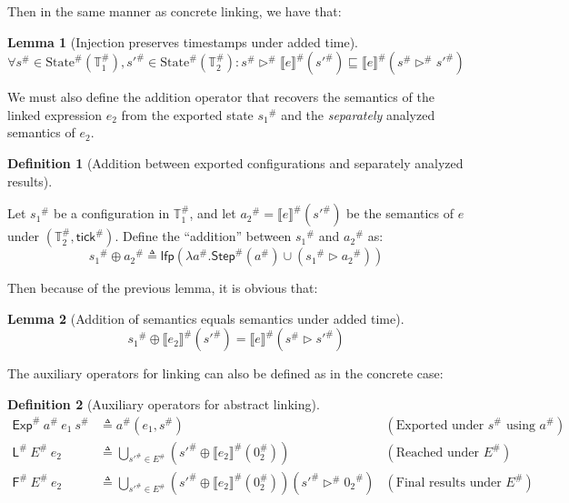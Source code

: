 \documentclass[acmsmall,review]{acmart}\settopmatter{printfolios=true,printccs=false,printacmref=false}
\theoremstyle{definition}
\newtheorem{definition}{Definition}[section]
\newtheorem{lem}{Lemma}[section]
\newcommand*{\A}[1]{{#1}^{\#}}
\newcommand*{\Time}{\mathbb{T}}
\newcommand*{\ATime}{\A{\Time}}
\newcommand*{\AState}[1]{\A{\text{State}}({#1})}
\newcommand*{\EE}{\mathsf{Exp}}
\newcommand*{\LL}{\mathsf{L}}
\newcommand*{\sembracket}[1]{\lBrack{#1}\rBrack}
\newcommand*{\tick}{\mathsf{tick}}
\begin{document}
Then in the same manner as concrete linking, we have that:

\begin{lem}[Injection preserves timestamps under added time]
  \[
    \forall \A{s}\in\AState{\ATime_1},\A{s'}\in\AState{\ATime_2}:\A{s}\A\rhd{\A{\sembracket{e}}}(\A{s'})\sqsubseteq\A{\sembracket{e}}(\A{s}\A\rhd\A{s'})
  \]
\end{lem}

We must also define the addition operator that recovers the semantics of the linked expression $e_2$ from the exported state $\A{s_1}$ and the \emph{separately} analyzed semantics of $e_2$.

\begin{definition}[Addition between exported configurations and separately analyzed results]
  $\:$

  Let $\A{s_1}$ be a configuration in $\ATime_1$, and let $\A{a_2}=\A{\sembracket{e}}(\A{s'})$ be the semantics of $e$ under $(\ATime_2,\A\tick)$.
  Define the ``addition'' between $\A{s_1}$ and $\A{a_2}$ as:
  \[
    \A{s_1}\oplus\A{a_2}\triangleq\mathsf{lfp}(\lambda\A{a}.\A{\mathsf{Step}}(\A{a})\cup(\A{s_1}\rhd\A{a_2}))
  \]
\end{definition}

Then because of the previous lemma, it is obvious that:
\begin{lem}[Addition of semantics equals semantics under added time]
  \[
    \A{s_1}\oplus\A{\sembracket{e_2}}(\A{s'}) = \A{\sembracket{e}}(\A{s}\rhd\A{s'})
  \]
\end{lem}

The auxiliary operators for linking can also be defined as in the concrete case:
\begin{definition}[Auxiliary operators for abstract linking]
  \begin{align*}
    \A\EE\:\A{a}\:e_1\:\A{s}   & \triangleq\A{a}(e_1,\A{s})                                                                          & (\text{Exported under }\A{s}\text{ using }\A{a}) \\
    \A\LL\:\A{E}\:e_2          & \triangleq\bigcup_{\A{s'}\in \A{E}}(\A{s'}\oplus\A{\sembracket{e_2}}(\A{0}_2))                      & (\text{Reached under }\A{E})                     \\
    \A{\mathsf{F}}\:\A{E}\:e_2 & \triangleq\bigcup_{\A{s'}\in \A{E}}(\A{s'}\oplus\A{\sembracket{e_2}}(\A{0}_2))(\A{s'}\A\rhd\A{0_2}) & (\text{Final results under }\A{E})
  \end{align*}
\end{definition}
\end{document}
